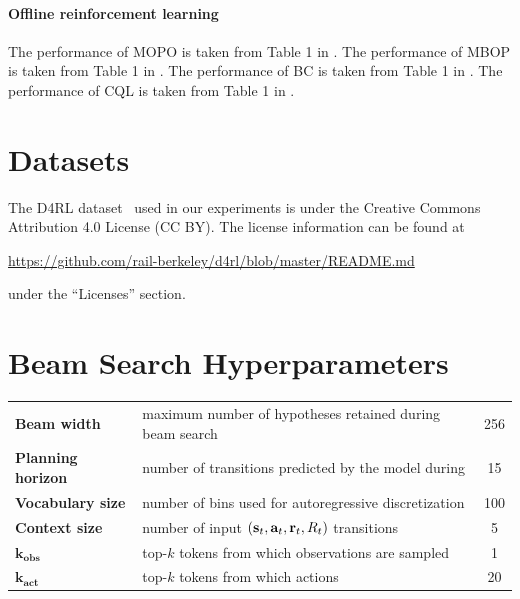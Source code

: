 \begin{appendices}
\paragraph{Offline reinforcement learning} The performance of MOPO is taken from Table 1 in \citet{yu2020mopo}. The performance of MBOP is taken from Table 1 in \citet{argenson2020model}. The performance of BC is taken from Table 1 in \citet{kumar2020conservative}. The performance of CQL is taken from Table 1 in \citet{kostrikov2021implicit}.

\section{Datasets}
\label{app:data}
The D4RL dataset~\citep{fu2020d4rl} used in our experiments is under the Creative Commons Attribution 4.0 License (CC BY). The license information can be found at

\begin{centering}
    \url{https://github.com/rail-berkeley/d4rl/blob/master/README.md} \\
\end{centering}
\vspace{.2cm}

under the ``Licenses'' section. 

\newpage
\section{Beam Search Hyperparameters}

\begin{center}
\def\arraystretch{1.35}
\begin{tabular}{|l|l|c|} 
\hline
\textbf{Beam width} & maximum number of hypotheses retained during beam search & 256 \\
\textbf{Planning horizon} & number of transitions predicted by the model during & 15 \\
\textbf{Vocabulary size} & number of bins used for autoregressive discretization & 100 \\
\textbf{Context size} & number of input $(\mathbf{s}_t, \mathbf{a}_t, \mathbf{r}_t, R_t)$ transitions & 5 \\
$\bm{k_\textbf{obs}}$ & top-$k$ tokens from which observations are sampled & 1 \\
$\bm{k_\textbf{act}}$ & top-$k$ tokens from which actions & 20 \\
\hline
\end{tabular}
\end{center}


\end{appendices}
